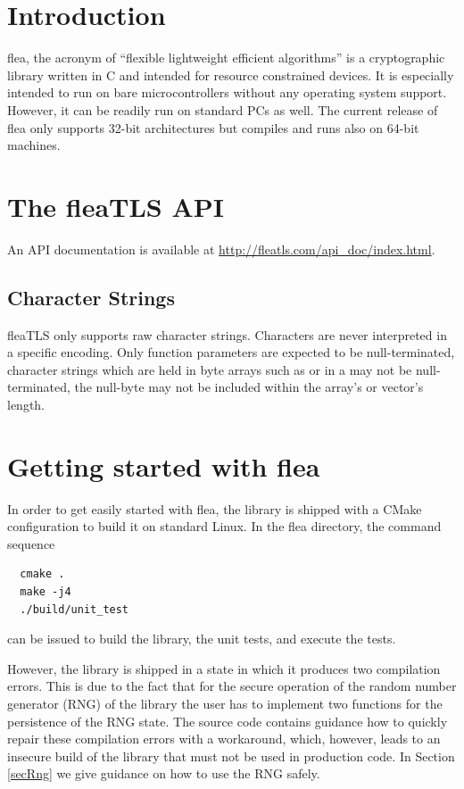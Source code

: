 \documentclass[a4paper,11pt]{scrartcl}
\begin{document}
\newpage

\section{Introduction}
flea, the acronym of ``flexible lightweight efficient algorithms'' is a
cryptographic library written in C and intended for resource
constrained devices. 
It is especially intended to run on bare microcontrollers without
any operating system support. However, it can be readily run on standard PCs as
well. The current release of flea only supports 32-bit architectures but
compiles and runs also on 64-bit machines.

 
  \section{The fleaTLS API}
  An API documentation is available at
  \url{http://fleatls.com/api_doc/index.html}.


  \subsection{Character Strings}

  fleaTLS only supports raw character strings. Characters are never interpreted in 
  a specific encoding. Only  function parameters are expected to be
  null-terminated, character strings which are held in byte arrays such as
   or in a  may not be
  null-terminated, \ie the null-byte may not be included within the array's or
  vector's length.

\section{Getting started with flea}

  In order to get easily started with flea, the library is shipped with a CMake
  configuration to build it on standard Linux. In the
  flea directory, the command sequence 
  \begin{verbatim}
  cmake .
  make -j4
  ./build/unit_test
  \end{verbatim}
  can be issued to build the library, the unit tests, and execute the tests.

  However, the library is shipped in a state in which it produces two
  compilation errors. This is due to the fact that for the secure operation of
  the random number generator (RNG) of the library the user has to implement two
  functions for the persistence of the RNG state. The source code contains
  guidance how to quickly repair these compilation errors with a workaround,
  which, however, leads to an insecure build of the library that must not be
  used in production code. In Section \ref{secRng} we give guidance on how to use
  the RNG safely.
\end{document}
